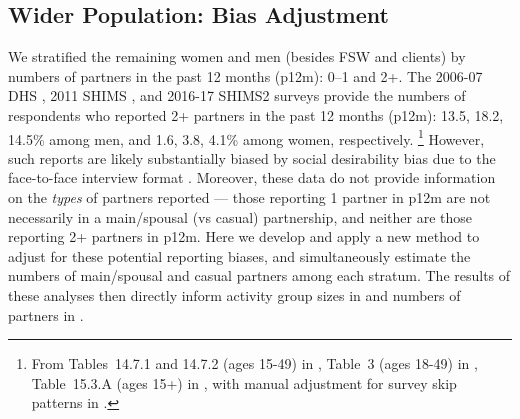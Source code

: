 \subsection{Wider Population: Bias Adjustment}\label{mod.par.wp}
We stratified the remaining women and men (besides FSW and clients)
by numbers of partners in the past 12 months (p12m): 0--1 and 2+.
The 2006-07 DHS \cite{SDHS2006}, 2011 SHIMS \cite{SHIMS1}, and 2016-17 SHIMS2 \cite{SHIMS2} surveys
provide the numbers of respondents who reported 2+ partners in the past 12 months (p12m):
13.5, 18.2, 14.5\% among men, and 1.6, 3.8, 4.1\% among women, respectively.%
\footnote{From
  Tables~14.7.1 and 14.7.2 (ages 15-49) in \cite{SDHS2006},
  Table~3 (ages 18-49) in \cite{SHIMS1},
  Table~15.3.A (ages 15+) in \cite{SHIMS2},
  with manual adjustment for survey skip patterns in \cite{SDHS2006,SHIMS2}.}
However, such reports are likely substantially biased by
social desirability bias due to the face-to-face interview format
\cite{Konings1995,Plummer2004,Gregson2004,Behanzin2013}.
Moreover, these data do not provide information on the \emph{types} of partners reported
--- \ie those reporting 1 partner in p12m
are not necessarily in a main/spousal (vs casual) partnership,
and neither are those reporting 2+ partners in p12m.
Here we develop and apply a new method to adjust for these potential reporting biases,
and simultaneously estimate the numbers of main/spousal and casual partners among each stratum.
The results of these analyses then directly inform
activity group sizes in  and
numbers of partners in .
